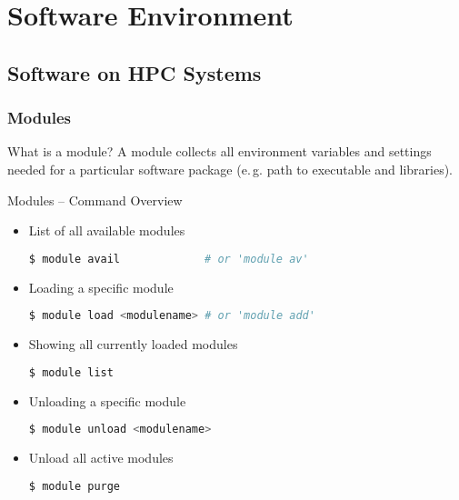 \section{Software Environment}



\subsection{Software on HPC Systems}

\begin{frame}
  \frametitle{Modules}
  \vspace{-1.3em}
  \begin{block}{What is a module?}
    A module collects all environment variables and settings needed for a particular software package (e.\,g. path to executable and libraries).
  \end{block}

  \vfill
\end{frame}


\begin{frame}[fragile]
  {Modules -- Command Overview}
  \vspace{-1em}
  \begin{itemize}
    \setlength\itemsep{-0.1em}
  \item List of all available modules
    \begin{lstlisting}[language=Bash, style=Shell]
$ module avail             # or 'module av'
    \end{lstlisting}
  \item Loading a specific module
    \begin{lstlisting}[language=Bash, style=Shell]
$ module load <modulename> # or 'module add'
    \end{lstlisting}
  \item Showing all currently loaded modules
    \begin{lstlisting}[language=Bash, style=Shell]
$ module list
    \end{lstlisting}
  \item Unloading a specific module
    \begin{lstlisting}[language=Bash, style=Shell]
$ module unload <modulename>
    \end{lstlisting}
  \item Unload all active modules
    \begin{lstlisting}[language=Bash, style=Shell]
$ module purge
    \end{lstlisting}
  \end{itemize}
  \vfill
\end{frame}

